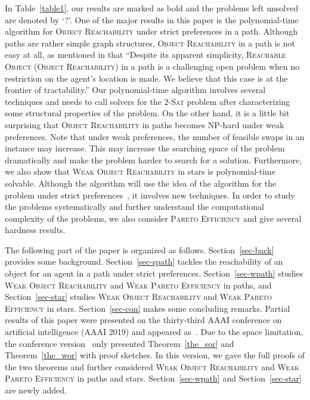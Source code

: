 In Table~\ref{table1}, our results are marked as bold and the problems left unsolved are denoted by `?'.
One of the major results in this paper is the polynomial-time algorithm for \textsc{Object Reachability} under strict preferences in a path.
Although paths are rather simple graph structures, \textsc{Object Reachability}
in a path is not easy at all, as mentioned in \citep{DBLP:conf/ijcai/GourvesLW17} that ``Despite its apparent simplicity, \textsc{Reachable Object} (\textsc{Object Reachability})
in a path is a challenging open problem when no restriction
on the agent's location is made. We believe that
this case is at the frontier of tractability.''
Our polynomial-time algorithm involves several techniques and needs to call solvers for the \textsc{2-Sat} problem after characterizing some structural properties of the problem.
On the other hand, it is a little bit surprising that \textsc{Object Reachability} in paths becomes NP-hard under weak preferences. Note that under weak preferences, the number of feasible swaps in an instance may increase. This may increase the searching space of the problem dramatically and make the problem harder to search for a solution.
Furthermore, we also show that \textsc{Weak Object Reachability} in stars is polynomial-time solvable. Although the algorithm will use the idea of the algorithm for the problem under strict preferences~\citep{DBLP:conf/ijcai/GourvesLW17}, it involves new techniques.
In order to study the problems systematically and further understand the computational complexity of the problems, we also consider \textsc{Pareto Efficiency} and give several hardness results.



The following part of the paper is organized as follows.
Section~\ref{sec-back} provides some background.
Section~\ref{sec-spath} tackles the reachability of an object for an agent in a path under strict preferences.
Section~\ref{sec-wpath} studies \textsc{Weak Object Reachability} and \textsc{Weak Pareto Efficiency} in paths, and
Section~\ref{sec-star} studies \textsc{Weak Object Reachability} and \textsc{Weak Pareto Efficiency} in stars.
Section~\ref{sec-con} makes some concluding remarks.
Partial results of this paper were presented on the thirty-third AAAI conference on artificial intelligence (AAAI 2019) and appeared as~\cite{or_aaai}.
Due to the space limitation, the conference version~\cite{or_aaai} only presented Theorem~\ref{the_sor} and Theorem~\ref{the_wor} with proof sketches.
In this version, we gave the full proofs of the two theorems and further considered \textsc{Weak Object Reachability} and \textsc{Weak Pareto Efficiency} in paths and stars.
Section~\ref{sec-wpath} and Section~\ref{sec-star} are newly added.





